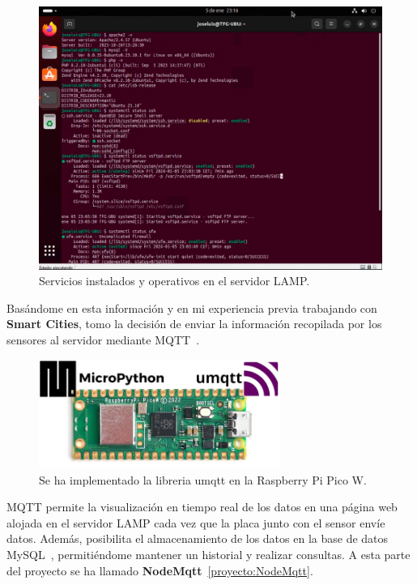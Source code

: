 \begin{figure}[h]
	\centering
	\includegraphics[width=1\textwidth]{img/desarrollo/LAMP_servicios.png}
	\caption{Servicios instalados y operativos en el servidor LAMP.} \label{Img:LAMP_servicios}
\end{figure}

Basándome en esta información y en mi experiencia previa trabajando con \textbf{Smart Cities}, tomo la decisión de enviar la información recopilada por los sensores al servidor mediante MQTT~\cite{manual:MQTT}. 

\begin{figure}[h]
	\centering
	\includegraphics[width=0.7\textwidth]{img/herramientas/rpipicow_umqtt.png}
	\caption{Se ha implementado la libreria umqtt en la Raspberry Pi Pico W.} \label{Img:rpipicow_umqtt}
\end{figure}

MQTT permite la visualización en tiempo real de los datos en una página web alojada en el servidor LAMP cada vez que la placa junto con el sensor envíe datos. Además, posibilita el almacenamiento de los datos en la base de datos MySQL~\cite{misc:Mysql}, permitiéndome mantener un historial y realizar consultas. A esta parte del proyecto se ha llamado \textbf{NodeMqtt}~\ref{proyecto:NodeMqtt}.

